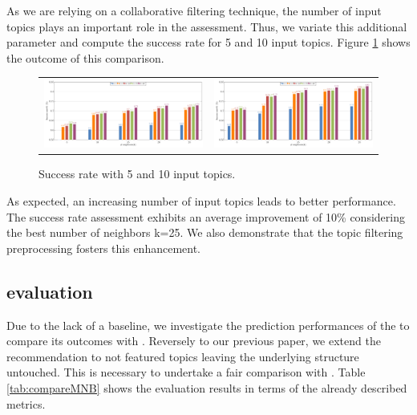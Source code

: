 As we are relying on a collaborative filtering technique, the number of input topics plays an important role in the assessment. Thus, we variate this additional parameter and compute the success rate for 5 and 10 input topics. Figure \ref{fig:success5_10} shows the outcome of this comparison.  

\begin{figure}
\centering
	\begin{tabular}{c c}	
	\includegraphics[width=0.45\linewidth]{figs/successRateN@5.pdf} &
	\includegraphics[width=0.45\linewidth]{figs/successRateN@10.pdf}
	\end{tabular}

	\caption{Success rate with 5 and 10 input topics.}
	\label{fig:success5_10}
\end{figure}

As expected, an increasing number of input topics leads to better performance. The success rate assessment exhibits an average improvement of 10\% considering the best number of neighbors \ie k=25. We also demonstrate that the topic filtering preprocessing fosters this enhancement. 



\subsection{\MNB evaluation} \label{sec:EXP2}

\rqsecond

Due to the lack of a baseline, we investigate the prediction performances of the \MNB to compare its outcomes with \CT. Reversely to our previous paper, we extend the \MNB recommendation to not featured topics leaving the underlying structure untouched. This is necessary to undertake a fair comparison with \CT. Table \ref{tab:compareMNB} shows the evaluation results in terms of the already described metrics. 


